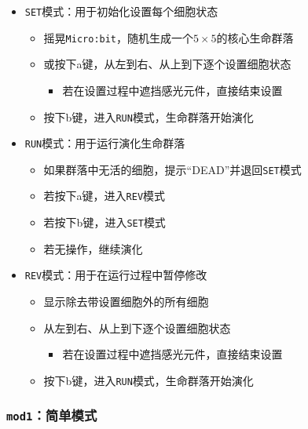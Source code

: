 \documentclass[11pt]{article}
\providecommand{\tightlist}{%
      \setlength{\itemsep}{0pt}\setlength{\parskip}{0pt}}
\begin{document}
\begin{itemize}
\tightlist
\item
  \texttt{SET}模式：用于初始化设置每个细胞状态

  \begin{itemize}
  \tightlist
  \item
    摇晃\texttt{Micro:bit}，随机生成一个\(5\times 5\)的核心生命群落
  \item
    或按下a键，从左到右、从上到下逐个设置细胞状态

    \begin{itemize}
    \tightlist
    \item
      若在设置过程中遮挡感光元件，直接结束设置
    \end{itemize}
  \item
    按下b键，进入\texttt{RUN}模式，生命群落开始演化
  \end{itemize}
\item
  \texttt{RUN}模式：用于运行演化生命群落

  \begin{itemize}
  \tightlist
  \item
    如果群落中无活的细胞，提示``DEAD''并退回\texttt{SET}模式
  \item
    若按下a键，进入\texttt{REV}模式
  \item
    若按下b键，进入\texttt{SET}模式
  \item
    若无操作，继续演化
  \end{itemize}
\item
  \texttt{REV}模式：用于在运行过程中暂停修改

  \begin{itemize}
  \tightlist
  \item
    显示除去带设置细胞外的所有细胞
  \item
    从左到右、从上到下逐个设置细胞状态

    \begin{itemize}
    \tightlist
    \item
      若在设置过程中遮挡感光元件，直接结束设置
    \end{itemize}
  \item
    按下b键，进入\texttt{RUN}模式，生命群落开始演化
  \end{itemize}
\end{itemize}

    \hypertarget{mod1ux7b80ux5355ux6a21ux5f0f}{%
\subsubsection{\texorpdfstring{\texttt{mod1}：简单模式}{mod1：简单模式}}\label{mod1ux7b80ux5355ux6a21ux5f0f}}
\end{document}

